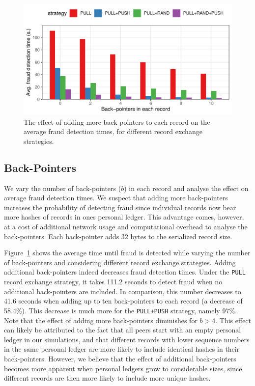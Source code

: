 \begin{figure}[t]
	\centering
	\includegraphics[width=.9\linewidth]{trustchain/assets/fraud_times_back_pointers}
	\caption{The effect of adding more back-pointers to each record on the average fraud detection times, for different record exchange strategies.}
	\label{fig:fraud_times_back_pointers}
\end{figure}

\subsection{Back-Pointers}
We vary the number of back-pointers ($ b $) in each record and analyse the effect on average fraud detection times.
We suspect that adding more back-pointers increases the probability of detecting fraud since individual records now bear more hashes of records in ones personal ledger.
This advantage comes, however, at a cost of additional network usage and computational overhead to analyse the back-pointers.
Each back-pointer adds 32 bytes to the serialized record size.

Figure~\ref{fig:fraud_times_back_pointers} shows the average time until fraud is detected while varying the number of back-pointers and considering different record exchange strategies.
Adding additional back-pointers indeed decreases fraud detection times.
Under the \texttt{PULL} record exchange strategy, it takes 111.2 seconds to detect fraud when no additional back-pointers are included. In comparison, this number decreases to 41.6 seconds when adding up to ten back-pointers to each record (a decrease of 58.4\%).
This decrease is much more for the \texttt{PULL+PUSH} strategy, namely 97\%.
Note that the effect of adding more back-pointers diminishes for $ b > 4 $.
This effect can likely be attributed to the fact that all peers start with an empty personal ledger in our simulations, and that different records with lower sequence numbers in the same personal ledger are more likely to include identical hashes in their back-pointers.
However, we believe that the effect of additional back-pointers becomes more apparent when personal ledgers grow to considerable sizes, since different records are then more likely to include more unique hashes.

